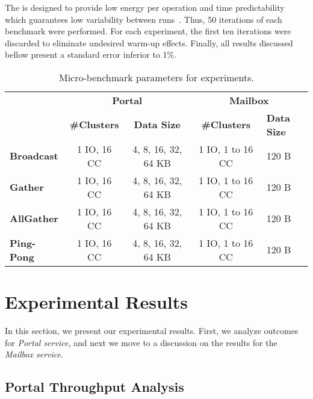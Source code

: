 			The \mppa is designed to provide low energy per operation and time
			predictability which guarantees low variability between runs~\cite{DeDinechin2013-1}.
			Thus, 50 iterations of each benchmark were performed. For each
			experiment, the first ten iterations were discarded to eliminate
			undesired warm-up effects. Finally, all results discussed bellow
			present a standard error inferior to 1\%.

			\begin{table}[!tb]
				\centering%
				\caption{Micro-benchmark parameters for experiments.}%
				\label{tab:benchmarks-parameters}%

				\begin{tabular}{l|c|c|c|l|}
					\cline{2-5}
															 & \multicolumn{2}{c|}{\textbf{Portal}}      & \multicolumn{2}{c|}{\textbf{Mailbox}}    \\ \cline{2-5}
															 & \textbf{\#Clusters} & \textbf{Data Size}  & \textbf{\#Clusters} & \textbf{Data Size} \\ \hline
					\multicolumn{1}{|l|}{\textbf{Broadcast}} & 1 IO, 16 CC         & 4, 8, 16, 32, 64 KB & 1 IO, 1 to 16 CC    & 120 B              \\ \hline
					\multicolumn{1}{|l|}{\textbf{Gather}}    & 1 IO, 16 CC         & 4, 8, 16, 32, 64 KB & 1 IO, 1 to 16 CC    & 120 B              \\ \hline
					\multicolumn{1}{|l|}{\textbf{AllGather}} & 1 IO, 16 CC         & 4, 8, 16, 32, 64 KB & 1 IO, 1 to 16 CC    & 120 B              \\ \hline
					\multicolumn{1}{|l|}{\textbf{Ping-Pong}} & 1 IO, 16 CC         & 4, 8, 16, 32, 64 KB & 1 IO, 1 to 16 CC    & 120 B              \\ \hline
				\end{tabular}

			\end{table}

	\section{Experimental Results}
	\label{sec.experimental-results}

		In this section, we present our experimental results. First, we
		analyze outcomes for \textit{Portal service}, and next we move to
		a discussion on the results for the \textit{Mailbox service}.

		\subsection{Portal Throughput Analysis}

